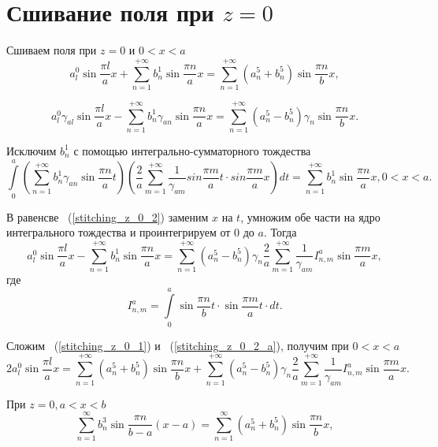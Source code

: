 \chapter{Сшивание поля при $z=0$}

Сшиваем поля при $z = 0$ и $0 < x < a$
\begin{equation}
	\label{stitching_z_0_1}
	a_l^0\sin{\frac{\pi l}{a}x} + \sum\limits_{n=1}^{+\infty}b_n^1\sin{\frac{\pi n}{a}x} = \sum\limits_{n=1}^{+\infty}\left(a_n^5+b_n^5\right)\sin{\frac{\pi n}{b}x},
\end{equation}

\begin{equation}
	\label{stitching_z_0_2}
	a_l^0\gamma_{al}\sin{\frac{\pi l}{a}x} - \sum\limits_{n=1}^{+\infty}b_n^1\gamma_{an}\sin{\frac{\pi n}{a}x} = \sum\limits_{n=1}^{+\infty}\left(a_n^5-b_n^5\right)\gamma_{n}\sin{\frac{\pi n}{b}x}.
\end{equation}

Исключим $b_n^1$ с помощью интегрально-сумматорного тождества
$$
	\int\limits_0^a\left(\sum\limits_{n=1}^{+\infty}b_n^1\gamma_{an}\sin{\frac{\pi n}{a}t}\right)\left(\frac{2}{a}\sum\limits_{m=1}^{+\infty}\frac{1}{\gamma_{am}}sin{\frac{\pi m}{a}t} \cdot sin{\frac{\pi m}{a}x}\right)dt = \sum\limits_{n=1}^{+\infty}b_n^1\sin{\frac{\pi n}{a}x}, 0 < x < a.
$$

В равенсве ~(\ref{stitching_z_0_2}) заменим $x$ на $t$, умножим обе части на ядро интегрального тождества и проинтегрируем от $0$ до $a$. Тогда
\begin{equation}
	\label{stitching_z_0_2_a}
	a_l^0\sin{\frac{\pi l}{a}x}-\sum\limits_{n=1}^{+\infty}b_n^1\sin{\frac{\pi n}{a}x} = \sum\limits_{n=1}^{+\infty}\left(a_n^5-b_n^5\right)\gamma_{n}\frac{2}{a}\sum\limits_{m=1}^{+\infty}\frac{1}{\gamma_{am}}I_{n,m}^a\sin{\frac{\pi m}{a}x},
\end{equation}
где
$$
	I_{n,m}^a = \int\limits_0^a\sin{\frac{\pi n}{b}t} \cdot \sin{\frac{\pi m}{a}t} \cdot dt.
$$

Сложим ~(\ref{stitching_z_0_1}) и ~(\ref{stitching_z_0_2_a}), получим при $0 < x < a$
\begin{equation}
	\label{stitching_z_0_3}
	2a_l^0\sin{\frac{\pi l}{a}x} = \sum\limits_{n=1}^{+\infty}\left(a_n^5+b_n^5\right)\sin{\frac{\pi n}{b}x} + \sum\limits_{n=1}^{+\infty}\left(a_n^5-b_n^5\right)\gamma_{n}\frac{2}{a}\sum\limits_{m=1}^{+\infty}\frac{1}{\gamma_{am}}I_{n,m}^a\sin{\frac{\pi m}{a}x}.
\end{equation}

При $z = 0, a < x < b$
\begin{equation}
	\label{stitching_z_0_4}
	\sum\limits_{n=1}^{\infty}b_n^3\sin{\frac{\pi n}{b-a}(x-a)} = \sum\limits_{n=1}^{\infty}\left(a_n^5+b_n^5\right)\sin{\frac{\pi n}{b}x},	
\end{equation}

